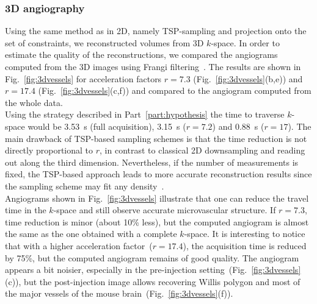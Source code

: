 \documentclass{article}
\begin{document}
\subsubsection{3D angiography}
\vspace*{-.02 \linewidth}
Using the same method as in 2D, namely TSP-sampling and projection onto the set of constraints, we reconstructed volumes from 3D $k$-space. In order to estimate the quality of the reconstructions, we compared the angiograms computed from the 3D images using Frangi filtering~\cite{Frangi98}. The results are shown in Fig.~\ref{fig:3dvessels} for acceleration factors $r=7.3$ (Fig.~\ref{fig:3dvessels}(b,e)) and $r=17.4$ (Fig.~\ref{fig:3dvessels}(c,f)) and compared to the angiogram computed from the whole data.\\
\indent Using the strategy described in Part~\ref{part:hypothesis} the time to traverse $k$-space would be 3.53~s (full acquisition), 3.15~s ($r=7.2$) and 0.88~s ($r=17$). The main drawback of TSP-based sampling schemes is that the time reduction is not directly proportional to $r$, in contrast to classical 2D downsampling and reading out along the third dimension. Nevertheless, if the number of measurements is fixed, the TSP-based approach leads to more accurate reconstruction results since the sampling scheme may fit any density~\cite{Chauffert14}.\\
\indent Angiograms shown in Fig.~\ref{fig:3dvessels} illustrate that one can reduce the travel time in the $k$-space and still observe accurate microvascular structure. If $r=7.3$, time reduction is minor (about 10\% less), but the computed angiogram is almost the same as the one obtained with a complete $k$-space. It is interesting to notice that with a higher acceleration factor~($r=17.4$), the acquisition time is reduced by 75\%, but the computed angiogram remains of good quality. The angiogram appears a bit noisier, especially in the pre-injection setting~(Fig.~\ref{fig:3dvessels}(c)), but the post-injection image allows recovering Willis polygon and most of the major vessels of the mouse brain~(Fig.~\ref{fig:3dvessels}(f)).
\end{document}

